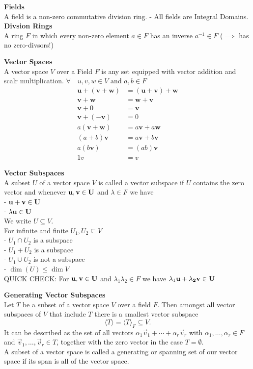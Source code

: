 \documentclass[a4paper, 10pt]{article}
\begin{document}
\begin{multicols*}{3}
\textbf{Fields}\\
A field is a non-zero commutative division ring. 
- All fields are Integral Domains. \\

\textbf{Divsion Rings}\\
A ring $F$ in which every non-zero element $a \in F$ has an inverse $a^{-1} \in F$ ($\implies$ has no zero-divsors!)

\textbf{Vector Spaces}\\
A vector space $V$ over a Field $F$ is any set equipped with vector addition and scalr multiplication.
$\forall\quad u, v, w \in V \text{ and } a,b\in F$
\begin{align*}
\mathbf{u}+(\mathbf{v}+\mathbf{w}) &= (\mathbf{u}+\mathbf{v})+\mathbf{w} \\
\mathbf{v}+\mathbf{w} &= \mathbf{w}+\mathbf{v} \\
\mathbf{v}+0 &= \mathbf{v} \\
\mathbf{v}+(-\mathbf{v}) &= 0 \\
a(\mathbf{v}+\mathbf{w}) &= a \mathbf{v}+a \mathbf{w} \\
(a+b) \mathbf{v} &= a \mathbf{v}+b \mathbf{v} \\
a(b \mathbf{v}) &= (a b) \mathbf{v} \\
1 v &= v 
\end{align*}

\textbf{Vector Subspaces}\\
A subset $U$ of a vector space $V$ is called a vector subspace if $U$ contains the zero vector and whenever $\bf{u}, \bf{v}\in U$ and $\lambda\in F$ we have \\
- $\bf{u} + \bf{v} \in U$\\
- $\lambda\bf{u}\in U$\\
We write $U\subseteq V$.\\
For infinite and finite $U_{1}, U_{2}\subseteq V$\\
- $U_{1}\cap U_{2}$  is a subspace\\
- $U_{1}+U_{2}$  is a subspace\\
- $U_{1}\cup U_{2}$  is not a subspace\\
- $\dim(U) \leq \dim V$\\
QUICK CHECK: For  $\bf{u}, \bf{v}\in U$ and $\lambda_{1}\lambda_{2}\in F$ we have $\lambda_{1}\bf{u}+\lambda_{2}\bf{v}\in U$

\textbf{Generating Vector Subspaces}\\
Let $T$ be a subset of a vector space $V$ over a field $F$. Then amongst all vector subspaces of $V$ that include $T$ there is a smallest vector subspace
$$
\langle T\rangle= \langle T\rangle_F \subseteq V .
$$
It can be described as the set of all vectors $\alpha_1 \vec{v}_1+\cdots+\alpha_r \vec{v}_r$ with $\alpha_1, \ldots, \alpha_r \in F$ and $\vec{v}_1, \ldots, \vec{v}_r \in T$, together with the zero vector in the case $T=\emptyset$.\\
A subset of a vector space is called a generating or spanning set of our vector space if its span is all of the vector space.


\end{multicols*}
\end{document}
